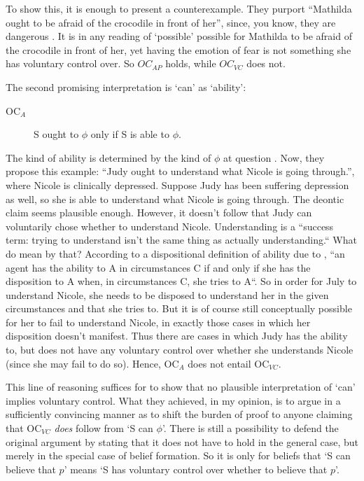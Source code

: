 \documentclass[12pt,numbers=noenddot]{scrartcl}
\begin{document}
 To show this, it is enough to present a counterexample. They purport “Mathilda ought to be afraid of the crocodile in front of her”, since, you know, they are dangerous \autocite[616]{Chuard2009-CHUENW}. It is in any reading of ‘possible’ possible for Mathilda to be afraid of the crocodile in front of her, yet having the emotion of fear is not something she has voluntary control over. So $OC_{AP}$ holds, while $OC_{VC}$ does not.

 The second promising interpretation is ‘can’ as ‘ability’:

 \begin{description}
    \item[OC$_{A}$] S ought to $\phi$ only if S is able to $\phi$.
 \end{description}

 The kind of ability is determined by the kind of $\phi$ at question \autocite[617]{Chuard2009-CHUENW}. Now, they propose this example: “Judy ought to understand what Nicole is going through.”, where Nicole is clinically depressed. Suppose Judy has been suffering depression as well, so she is able to understand what Nicole is going through. The deontic claim seems plausible enough. However, it doesn't follow that Judy can voluntarily chose whether to understand Nicole. Understanding is a “success term: trying to understand isn’t the same thing as actually understanding.“ What do \textcite[617]{Chuard2009-CHUENW} mean by that? According to a dispositional definition of ability due to \textcite[848]{Fara2008-FARMAA}, “an agent has the ability to A in circumstances C if and only if she has the disposition to A when, in circumstances C, she tries to A“. So in order for July to understand Nicole, she needs to be disposed to understand her in the given circumstances and that she tries to. But it is of course still conceptually possible for her to fail to understand Nicole, in exactly those cases in which her disposition doesn't manifest. Thus there are cases in which Judy has the ability to, but does not have any voluntary control over whether she understands Nicole (since she may fail to do so). Hence, OC$_A$ does not entail OC$_{VC}$.

This line of reasoning suffices for \textcite[618]{Chuard2009-CHUENW} to show that no plausible interpretation of ‘can’ implies voluntary control. What they achieved, in my opinion, is to argue in a sufficiently convincing manner as to shift the burden of proof to anyone claiming that OC$_{VC}$ \emph{does} follow from ‘S can $\phi$’. There is still a possibility to defend the original argument by stating that it does not have to hold in the general case, but merely in the special case of belief formation. So it is only for beliefs that ‘S can believe that $p$’ means ‘S has voluntary control over whether to believe that $p$’.
\end{document}
